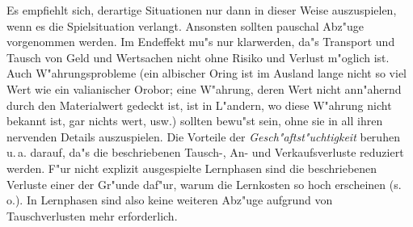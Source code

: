 \documentclass[10pt,a4paper,germanpar]{article}
\begin{document}
Es empfiehlt sich, derartige Situationen nur dann in dieser Weise
auszuspielen, wenn es die Spielsituation verlangt. Ansonsten sollten
pauschal Abz"uge vorgenommen werden. Im Endeffekt mu"s nur klarwerden,
da"s Transport und Tausch von Geld und Wertsachen nicht ohne Risiko
und Verlust m"oglich ist. Auch W"ahrungsprobleme (ein albischer Oring
ist im Ausland lange nicht so viel Wert wie ein valianischer Orobor;
eine W"ahrung, deren Wert nicht ann"ahernd durch den Materialwert
gedeckt ist, ist in L"andern, wo diese W"ahrung nicht bekannt ist, gar
nichts wert, usw.) sollten bewu"st sein, ohne sie in all ihren
nervenden Details auszuspielen. Die Vorteile der
\emph{Gesch"aftst"uchtigkeit} beruhen u.\,a.  darauf, da"s die
beschriebenen Tausch-, An- und Verkaufsverluste reduziert werden. F"ur
nicht explizit ausgespielte Lernphasen sind die beschriebenen Verluste
einer der Gr"unde daf"ur, warum die Lernkosten so hoch erscheinen
(s.\,o.). In Lernphasen sind also keine weiteren Abz"uge aufgrund von
Tauschverlusten mehr erforderlich.
\end{document}
